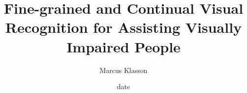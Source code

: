 \documentclass[electronic, oldfontcommands]{kthesis}
\begin{document}
	
\title{Fine-grained and Continual Visual Recognition for Assisting Visually Impaired People}
\author{Marcus Klasson}
\date{date}
\address{KTH Royal Institute of Technology \\School of Electrical Engineering and Computer Science\\ Division of Robotics, Perception, and Learning \\ SE-10044 Stockholm\\ Sweden}
	
\maketitle

\frontmatter %


\newpage










	
\mainmatter %
\begingroup
\hypersetup{hidelinks} %
\tableofcontents
\endgroup
\end{document}
